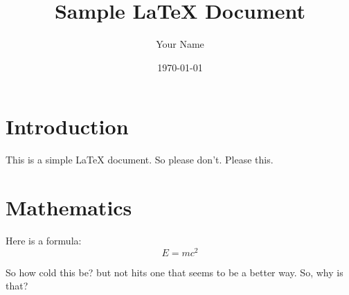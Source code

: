 \documentclass{article}
\begin{document}
\title{Sample LaTeX Document}
\author{Your Name}
\date{\today}
\maketitle

\section{Introduction}
This is a simple LaTeX document. So please don't. Please this.

\section{Mathematics}
Here is a formula:
\[
E = mc^2
\]

So how cold this be? but not hits one that seems to be a better way.
So, why is that?
\end{document}
